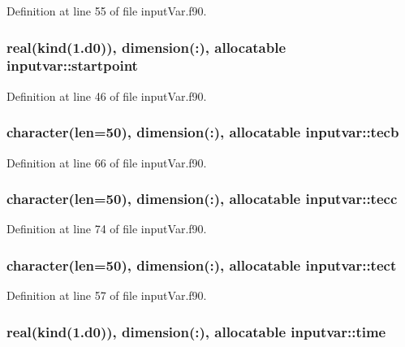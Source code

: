 Definition at line 55 of file input\-Var.\-f90.

\hypertarget{classinputvar_a8a730b8445d97ba3812647c22689dc01}{
\subsubsection[{startpoint}]{\setlength{\rightskip}{0pt plus 5cm}real(kind(1.d0)), dimension(\-:), allocatable inputvar\-::startpoint}}\label{classinputvar_a8a730b8445d97ba3812647c22689dc01}


Definition at line 46 of file input\-Var.\-f90.

\hypertarget{classinputvar_ab2486a625a1ff1aaf70cb9e38d8c07db}{
\subsubsection[{tecb}]{\setlength{\rightskip}{0pt plus 5cm}character(len=50), dimension(\-:), allocatable inputvar\-::tecb}}\label{classinputvar_ab2486a625a1ff1aaf70cb9e38d8c07db}


Definition at line 66 of file input\-Var.\-f90.

\hypertarget{classinputvar_a2eb1c20cfae159c006e0fdc4b9ef0ef0}{
\subsubsection[{tecc}]{\setlength{\rightskip}{0pt plus 5cm}character(len=50), dimension(\-:), allocatable inputvar\-::tecc}}\label{classinputvar_a2eb1c20cfae159c006e0fdc4b9ef0ef0}


Definition at line 74 of file input\-Var.\-f90.

\hypertarget{classinputvar_afb7d5163d753c7bbd2c1505e8ee68197}{
\subsubsection[{tect}]{\setlength{\rightskip}{0pt plus 5cm}character(len=50), dimension(\-:), allocatable inputvar\-::tect}}\label{classinputvar_afb7d5163d753c7bbd2c1505e8ee68197}


Definition at line 57 of file input\-Var.\-f90.

\hypertarget{classinputvar_a1dcdb33405d780699da5958c347fad91}{
\subsubsection[{time}]{\setlength{\rightskip}{0pt plus 5cm}real(kind(1.d0)), dimension(\-:), allocatable inputvar\-::time}}\label{classinputvar_a1dcdb33405d780699da5958c347fad91}


